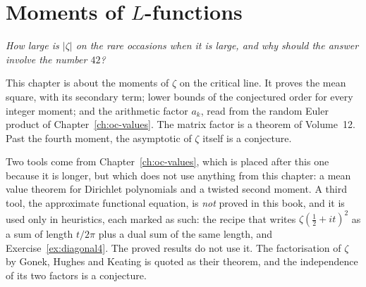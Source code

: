 \chapter{Moments of \texorpdfstring{$L$}{L}-functions}\label{ch:oc-moments}\label{ch:moments}

\begin{center}\itshape
How large is $|\zeta|$ on the rare occasions when it is large, and why should the answer involve the number $42$?
\end{center}

This chapter is about the moments of $\zeta$ on the critical line. It proves the mean square, with its secondary term; lower bounds of the conjectured order for every integer moment; and the arithmetic factor $a_k$, read from the random Euler product of Chapter~\ref{ch:oc-values}. The matrix factor is a theorem of Volume~12. Past the fourth moment, the asymptotic of $\zeta$ itself is a conjecture.

Two tools come from Chapter~\ref{ch:oc-values}, which is placed after this one because it is longer, but which does not use anything from this chapter: a mean value theorem for Dirichlet polynomials and a twisted second moment. A third tool, the approximate functional equation, is \emph{not} proved in this book, and it is used only in heuristics, each marked as such: the recipe that writes $\zeta(\frac12+it)^2$ as a sum of length $t/2\pi$ plus a dual sum of the same length, and Exercise~\ref{ex:diagonal4}. The proved results do not use it. The factorisation of $\zeta$ by Gonek, Hughes and Keating is quoted as their theorem, and the independence of its two factors is a conjecture.



